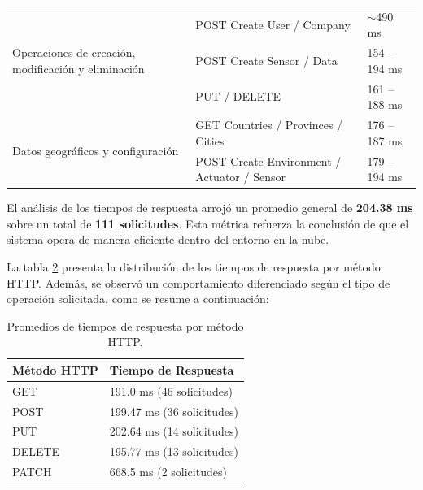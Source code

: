 \begin{table}[H]
\begin{tabular}{p{5cm}p{5.1cm}p{2.4cm}}
        \hline
        \multirow{3}{5cm}{Operaciones de creación, modificación y eliminación} & POST Create User / Company                  & $\sim$490 ms                 \\
                                                                               & POST Create Sensor / Data                   & 154 – 194 ms                 \\
                                                                               & PUT / DELETE                                & 161 – 188 ms                 \\
        \hline
        \multirow{4}{5cm}{Datos geográficos y configuración}                   & GET Countries / Provinces / Cities          & 176 – 187 ms                 \\
                                                                               & POST Create Environment / Actuator / Sensor & 179 – 194 ms                 \\
        \bottomrule
    \end{tabular}
    \label{tab:tiempos_respuesta}
\end{table}

El análisis de los tiempos de respuesta arrojó un promedio general de
\textbf{204.38 ms} sobre un total de \textbf{111 solicitudes}. Esta métrica
refuerza la conclusión de que el sistema opera de manera eficiente dentro del
entorno en la nube.

La tabla \ref{tab:promedios_metodo_http} presenta la distribución de los
tiempos de respuesta por método HTTP. Además, se observó un comportamiento
diferenciado según el tipo de operación solicitada, como se resume a
continuación:

\begin{table}[H]
    \centering
    \caption[Promedios de tiempos de respuesta]{Promedios de tiempos de respuesta por método HTTP.}
    \begin{tabular}{ l l }
        \toprule
        \textbf{Método HTTP} & \textbf{Tiempo de Respuesta} \\
        \midrule
        GET                  & 191.0 ms (46 solicitudes)    \\
        POST                 & 199.47 ms (36 solicitudes)   \\
        PUT                  & 202.64 ms (14 solicitudes)   \\
        DELETE               & 195.77 ms (13 solicitudes)   \\
        PATCH                & 668.5 ms (2 solicitudes)     \\
        \bottomrule
    \end{tabular}
    \label{tab:promedios_metodo_http}
\end{table}

